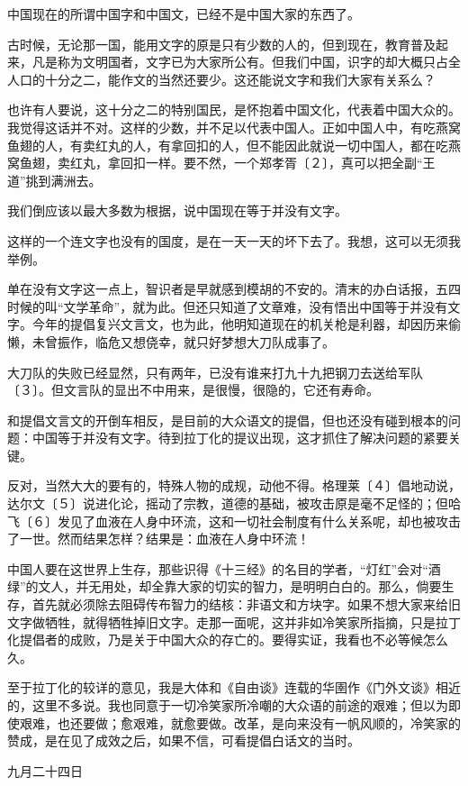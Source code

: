 
    中国现在的所谓中国字和中国文，已经不是中国大家的东西了。

    古时候，无论那一国，能用文字的原是只有少数的人的，但到现在，教育普及起来，凡是称为文明国者，文字已为大家所公有。但我们中国，识字的却大概只占全人口的十分之二，能作文的当然还要少。这还能说文字和我们大家有关系么？

    也许有人要说，这十分之二的特别国民，是怀抱着中国文化，代表着中国大众的。我觉得这话并不对。这样的少数，并不足以代表中国人。正如中国人中，有吃燕窝鱼翅的人，有卖红丸的人，有拿回扣的人，但不能因此就说一切中国人，都在吃燕窝鱼翅，卖红丸，拿回扣一样。要不然，一个郑孝胥〔２〕，真可以把全副“王道”挑到满洲去。

    我们倒应该以最大多数为根据，说中国现在等于并没有文字。

    这样的一个连文字也没有的国度，是在一天一天的坏下去了。我想，这可以无须我举例。

    单在没有文字这一点上，智识者是早就感到模胡的不安的。清末的办白话报，五四时候的叫“文学革命”，就为此。但还只知道了文章难，没有悟出中国等于并没有文字。今年的提倡复兴文言文，也为此，他明知道现在的机关枪是利器，却因历来偷懒，未曾振作，临危又想侥幸，就只好梦想大刀队成事了。

    大刀队的失败已经显然，只有两年，已没有谁来打九十九把钢刀去送给军队〔３〕。但文言队的显出不中用来，是很慢，很隐的，它还有寿命。

    和提倡文言文的开倒车相反，是目前的大众语文的提倡，但也还没有碰到根本的问题：中国等于并没有文字。待到拉丁化的提议出现，这才抓住了解决问题的紧要关键。

    反对，当然大大的要有的，特殊人物的成规，动他不得。格理莱〔４〕倡地动说，达尔文〔５〕说进化论，摇动了宗教，道德的基础，被攻击原是毫不足怪的；但哈飞〔６〕发见了血液在人身中环流，这和一切社会制度有什么关系呢，却也被攻击了一世。然而结果怎样？结果是：血液在人身中环流！

    中国人要在这世界上生存，那些识得《十三经》的名目的学者，“灯红”会对“酒绿”的文人，并无用处，却全靠大家的切实的智力，是明明白白的。那么，倘要生存，首先就必须除去阻碍传布智力的结核：非语文和方块字。如果不想大家来给旧文字做牺牲，就得牺牲掉旧文字。走那一面呢，这并非如冷笑家所指摘，只是拉丁化提倡者的成败，乃是关于中国大众的存亡的。要得实证，我看也不必等候怎么久。

    至于拉丁化的较详的意见，我是大体和《自由谈》连载的华圉作《门外文谈》相近的，这里不多说。我也同意于一切冷笑家所冷嘲的大众语的前途的艰难；但以为即使艰难，也还要做；愈艰难，就愈要做。改革，是向来没有一帆风顺的，冷笑家的赞成，是在见了成效之后，如果不信，可看提倡白话文的当时。

    \hfill 九月二十四日